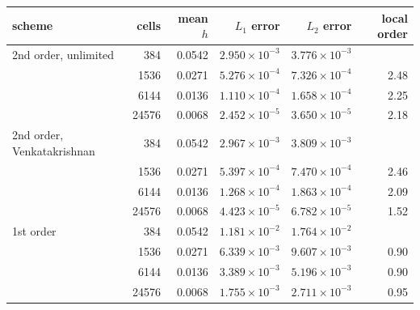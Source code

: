 \footnotesize
\begin{tabular}{lrrrrr}
\toprule
scheme & cells & mean $h$ & $L_1$ error & $L_2$ error & local order\\
\midrule
2nd order, unlimited & 384 & 0.0542 & $2.950\times 10^{-3}$ & $3.776\times 10^{-3}$ & \\
 & 1536 & 0.0271 & $5.276\times 10^{-4}$ & $7.326\times 10^{-4}$ & 2.48\\
 & 6144 & 0.0136 & $1.110\times 10^{-4}$ & $1.658\times 10^{-4}$ & 2.25\\
 & 24576 & 0.0068 & $2.452\times 10^{-5}$ & $3.650\times 10^{-5}$ & 2.18\\
\midrule
2nd order, Venkatakrishnan & 384 & 0.0542 & $2.967\times 10^{-3}$ & $3.809\times 10^{-3}$ & \\
 & 1536 & 0.0271 & $5.397\times 10^{-4}$ & $7.470\times 10^{-4}$ & 2.46\\
 & 6144 & 0.0136 & $1.268\times 10^{-4}$ & $1.863\times 10^{-4}$ & 2.09\\
 & 24576 & 0.0068 & $4.423\times 10^{-5}$ & $6.782\times 10^{-5}$ & 1.52\\
\midrule
1st order & 384 & 0.0542 & $1.181\times 10^{-2}$ & $1.764\times 10^{-2}$ & \\
 & 1536 & 0.0271 & $6.339\times 10^{-3}$ & $9.607\times 10^{-3}$ & 0.90\\
 & 6144 & 0.0136 & $3.389\times 10^{-3}$ & $5.196\times 10^{-3}$ & 0.90\\
 & 24576 & 0.0068 & $1.755\times 10^{-3}$ & $2.711\times 10^{-3}$ & 0.95\\
\bottomrule
\end{tabular}

